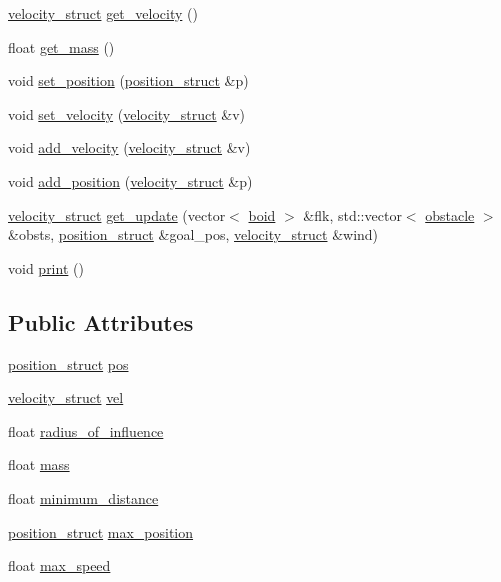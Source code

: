 \begin{DoxyCompactItemize}
\item 
\hyperlink{structvelocity__struct}{velocity\+\_\+struct} \hyperlink{classboid_ab2787ebabae81c74f226894c4d5fb390}{get\+\_\+velocity} ()
\item 
float \hyperlink{classboid_a14784740d2df3d2071ab5066247b7d14}{get\+\_\+mass} ()
\item 
void \hyperlink{classboid_a1c245c1b6fc1aedae014f2e624f2eb0e}{set\+\_\+position} (\hyperlink{structposition__struct}{position\+\_\+struct} \&p)
\item 
void \hyperlink{classboid_a3bcc3d0a4db33a26c87d87ee2e521c48}{set\+\_\+velocity} (\hyperlink{structvelocity__struct}{velocity\+\_\+struct} \&v)
\item 
void \hyperlink{classboid_a651fba1c974be1b037d9ac560c473d8a}{add\+\_\+velocity} (\hyperlink{structvelocity__struct}{velocity\+\_\+struct} \&v)
\item 
void \hyperlink{classboid_ae3fa9ca9038a2aea82b3cd59344cb92e}{add\+\_\+position} (\hyperlink{structvelocity__struct}{velocity\+\_\+struct} \&p)
\item 
\hyperlink{structvelocity__struct}{velocity\+\_\+struct} \hyperlink{classboid_a1e375f99449bc03548df0cc6bb5500c0}{get\+\_\+update} (vector$<$ \hyperlink{classboid}{boid} $>$ \&flk, std\+::vector$<$ \hyperlink{classobstacle}{obstacle} $>$ \&obsts, \hyperlink{structposition__struct}{position\+\_\+struct} \&goal\+\_\+pos, \hyperlink{structvelocity__struct}{velocity\+\_\+struct} \&wind)
\item 
void \hyperlink{classboid_ae78fe54b882be6ac24cf616216deba1d}{print} ()
\end{DoxyCompactItemize}
\subsection*{Public Attributes}
\begin{DoxyCompactItemize}
\item 
\hyperlink{structposition__struct}{position\+\_\+struct} \hyperlink{classboid_a7d96bcb0f27af38264d7bc0c596d23b5}{pos}
\item 
\hyperlink{structvelocity__struct}{velocity\+\_\+struct} \hyperlink{classboid_afc5791cc3a3915aff98b9e7ca88d9570}{vel}
\item 
float \hyperlink{classboid_a1be0d96d6dd39b6ebd29346c0da8a8ab}{radius\+\_\+of\+\_\+influence}
\item 
float \hyperlink{classboid_a09f01e18113bd347649c44876b78b438}{mass}
\item 
float \hyperlink{classboid_a95718cee2ea6ae5b1c19fa992d24db21}{minimum\+\_\+distance}
\item 
\hyperlink{structposition__struct}{position\+\_\+struct} \hyperlink{classboid_ac60a8859a11a09420c0800004f70d624}{max\+\_\+position}
\item 
float \hyperlink{classboid_ac03185a7bed8491922193b42b2716f3c}{max\+\_\+speed}
\end{DoxyCompactItemize}


